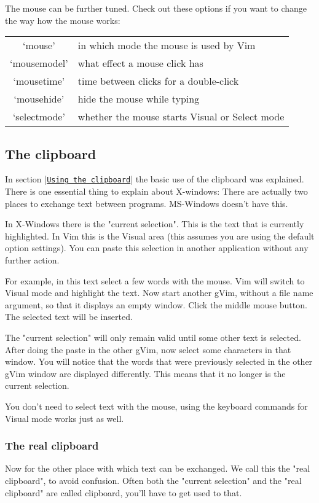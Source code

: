 The mouse can be further tuned.
Check out these options if you want to change the way how the mouse works:

\begin{center}\begin{longtable}{c l}
				`mouse' & in which mode the mouse is used by Vim \\
				`mousemodel' & what effect a mouse click has \\
				`mousetime' & time between clicks for a double-click \\
				`mousehide' & hide the mouse while typing \\
				`selectmode' & whether the mouse starts Visual or Select mode \\
\end{longtable}\end{center}
\subsection{The clipboard}
In section |\hyperref[Using the clipboard]{\texttt{Using the clipboard}}| the basic use of the clipboard was explained.
There is one essential thing to explain about X-windows: There are actually two places to exchange text between programs.
MS-Windows doesn't have this.

In X-Windows there is the "current selection".
This is the text that is currently highlighted.
In Vim this is the Visual area (this assumes you are using the default option settings).
You can paste this selection in another application without any further action.

For example, in this text select a few words with the mouse.
Vim will switch to Visual mode and highlight the text.
Now start another gVim, without a file name argument, so that it displays an empty window.
Click the middle mouse button.
The selected text will be inserted.

The "current selection" will only remain valid until some other text is selected.
After doing the paste in the other gVim, now select some characters in that window.
You will notice that the words that were previously selected in the other gVim window are displayed differently.
This means that it no longer is the current selection.

You don't need to select text with the mouse, using the keyboard commands for Visual mode works just as well.
\subsubsection{The real clipboard}
Now for the other place with which text can be exchanged.
We call this the "real clipboard", to avoid confusion.
Often both the "current selection" and the "real clipboard" are called clipboard, you'll have to get used to that.

